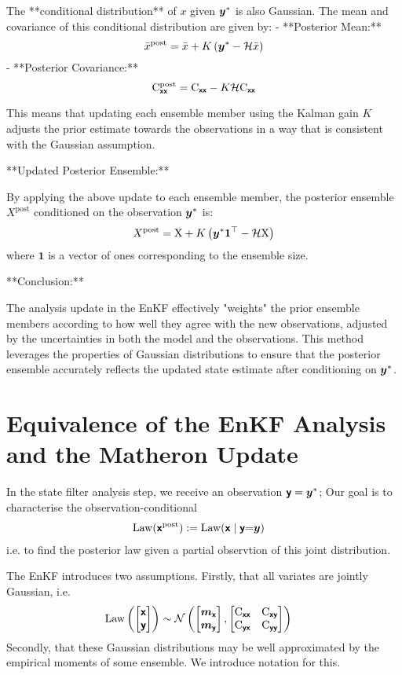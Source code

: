 \documentclass{article}
\begin{document}
{The **conditional distribution** of \( x \) given \(\boldsymbol{y}^*\) is also Gaussian. The mean and covariance of this conditional distribution are given by:
- **Posterior Mean:**
  \[
  \bar{x}^\text{post} = \bar{x} + K \left(\boldsymbol{y}^*- \mathcal{H} \bar{x} \right)
  \]
- **Posterior Covariance:**
  \[
   \mathrm{C}_{\boldsymbol{\mathsf{xx}}} ^\text{post} = \mathrm{C}_{\boldsymbol{\mathsf{xx}}} - K \mathcal{H}  \mathrm{C}_{\boldsymbol{\mathsf{xx}}}
  \]

This means that updating each ensemble member using the Kalman gain \( K \) adjusts the prior estimate towards the observations in a way that is consistent with the Gaussian assumption.

**Updated Posterior Ensemble:**

By applying the above update to each ensemble member, the posterior ensemble \( X^\text{post} \) conditioned on the observation \(\boldsymbol{y}^*\) is:
\[
X^\text{post} = \mathrm{X} + K \left(\boldsymbol{y}^*\mathbf{1}^\top - \mathcal{H} \mathrm{X} \right)
\]
where \( \mathbf{1} \) is a vector of ones corresponding to the ensemble size.

**Conclusion:**

The analysis update in the EnKF effectively "weights" the prior ensemble members according to how well they agree with the new observations, adjusted by the uncertainties in both the model and the observations. This method leverages the properties of Gaussian distributions to ensure that the posterior ensemble accurately reflects the updated state estimate after conditioning on \(\boldsymbol{y}^*\).

\section{Equivalence of the EnKF Analysis and the Matheron Update}


In the state filter analysis step, we receive an observation $\boldsymbol{\mathsf{y}}=\boldsymbol{y}^*$;
Our goal is to characterise the observation-conditional
\begin{align}
    \operatorname{Law}(\boldsymbol{\mathsf{x}}^{\text{post}})&:=\operatorname{Law}(\boldsymbol{\mathsf{x}}\mid \boldsymbol{\mathsf{y}}{=}\boldsymbol{y})
\end{align}
i.e. to find the posterior law given a partial observtion of this joint distribution.

The EnKF introduces two assumptions.
Firstly, that all variates are jointly Gaussian, i.e.
\begin{align}
    \operatorname{Law} \left( \begin{bmatrix}
        \boldsymbol{\mathsf{x}}\\
        \boldsymbol{\mathsf{y}}
    \end{bmatrix}\right) &\sim \mathcal{N}\left(\begin{bmatrix} \boldsymbol{m}_{\boldsymbol{\mathsf{x}}} \\ \boldsymbol{m}_{\boldsymbol{\mathsf{y}}} \end{bmatrix}, \begin{bmatrix} \mathrm{C}_{\boldsymbol{\mathsf{xx}}} & \mathrm{C}_{\boldsymbol{\mathsf{xy}}} \\ \mathrm{C}_{\boldsymbol{\mathsf{yx}}} & \mathrm{C}_{\boldsymbol{\mathsf{yy}}} \end{bmatrix}\right)
\end{align}
Secondly, that these Gaussian distributions may be well approximated by the empirical moments of some ensemble.
We introduce notation for this.

}
\end{document}
